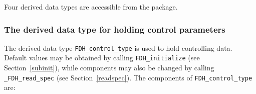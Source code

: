 \documentclass{galahad}
\newcommand{\packagename}{FDH}
\newcommand{\fullpackagename}{\libraryname\_\packagename}
\begin{document}

\galtypes
Four derived data types are accessible from the package.


\subsubsection{The derived data type for holding control 
 parameters}\label{typecontrol}
The derived data type 
{\tt \packagename\_control\_type} 
is used to hold controlling data. Default values may be obtained by calling 
{\tt \packagename\_initialize}
(see Section~\ref{subinit}),
while components may also be changed by calling 
{\tt \fullpackagename\_read\-\_spec}
(see Section~\ref{readspec}). 
The components of 
{\tt \packagename\_control\_type} 
are:
\end{document}
